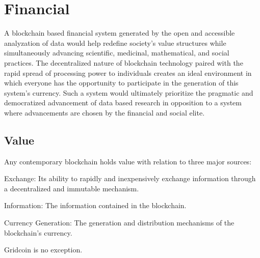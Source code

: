 \section{Financial}

\label{sec:finance}

A blockchain based financial system generated by the open and accessible analyzation of data would help redefine society’s value structures while simultaneously advancing scientific, medicinal, mathematical, and social practices.  The decentralized nature of blockchain technology paired with the rapid spread of processing power to individuals creates an ideal environment in which everyone has the opportunity to participate in the generation of this system’s currency.  Such a system would ultimately prioritize the pragmatic and democratized advancement of data based research in opposition to a system where advancements are chosen by the financial and social elite.

\subsection{Value}

Any contemporary blockchain holds value with relation to three major sources: \\

\begin{compactenum}
	\item Exchange: Its ability to rapidly and inexpensively exchange information through a decentralized and immutable mechanism.  \\
	\item Information: The information contained in the blockchain. \\
	\item Currency Generation: The generation and distribution mechanisms of the blockchain’s currency. \\
\end{compactenum}

Gridcoin is no exception. \\

